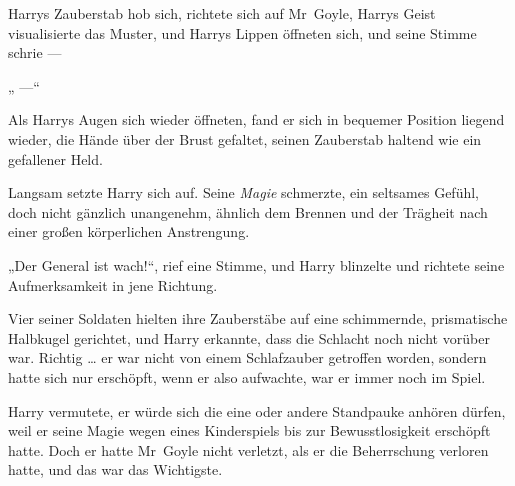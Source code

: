 \emph{}

Harrys Zauberstab hob sich, richtete sich auf Mr~Goyle, Harrys Geist visualisierte das Muster, und Harrys Lippen öffneten sich, und seine Stimme schrie —

„ —“

\later

Als Harrys Augen sich wieder öffneten, fand er sich in bequemer Position liegend wieder, die Hände über der Brust gefaltet, seinen Zauberstab haltend wie ein gefallener Held.

Langsam setzte Harry sich auf. Seine \emph{Magie} schmerzte, ein seltsames Gefühl, doch nicht gänzlich unangenehm, ähnlich dem Brennen und der Trägheit nach einer großen körperlichen Anstrengung.

„Der General ist wach!“, rief eine Stimme, und Harry blinzelte und richtete seine Aufmerksamkeit in jene Richtung.

Vier seiner Soldaten hielten ihre Zauberstäbe auf eine schimmernde, prismatische Halbkugel gerichtet, und Harry erkannte, dass die Schlacht noch nicht vorüber war. Richtig … er war nicht von einem Schlafzauber getroffen worden, sondern hatte sich nur erschöpft, wenn er also aufwachte, war er immer noch im Spiel.

Harry vermutete, er würde sich die eine oder andere Standpauke anhören dürfen, weil er seine Magie wegen eines Kinderspiels bis zur Bewusstlosigkeit erschöpft hatte. Doch er hatte Mr~Goyle nicht verletzt, als er die Beherrschung verloren hatte, und das war das Wichtigste.

